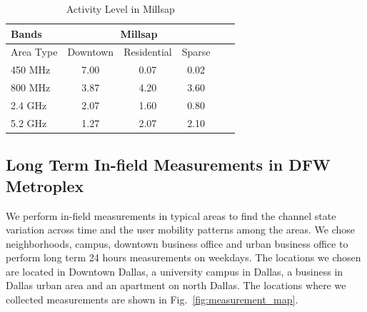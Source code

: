 \begin{table}
\centering %
\begin{tabular}{|l|c|c|c|c|c|} %
\hline %
Bands     & \multicolumn{3}{c|}{Millsap} \\%
\hline %
Area Type & Downtown & Residential & Sparse \\ %
\hline %
450 MHz & 7.00 & 0.07 & 0.02 \\      
\hline %
800 MHz & 3.87 & 4.20 & 3.60 \\      
\hline %
2.4 GHz & 2.07 & 1.60 & 0.80 \\      
\hline %
5.2 GHz & 1.27 & 2.07 & 2.10 \\      
\hline %
\end{tabular}    
\caption{Activity Level in Millsap} %
\label{tab:activitymeasurement_m}    
\end{table}    




\subsection{Long Term In-field Measurements in DFW Metroplex}
\label{subsec:measurements}

We perform in-field measurements in typical areas to find the channel state variation across 
time and the user mobility patterns among the areas.
We chose neighborhoods, campus, downtown business office and 
urban business office to perform long term 24 hours measurements on weekdays. 
The locations we chosen are located in Downtown Dallas, a university campus in Dallas, 
a business in Dallas urban area and an apartment on north Dallas. 
The locations where we collected measurements are shown in Fig.~\ref{fig:measurement_map}.

